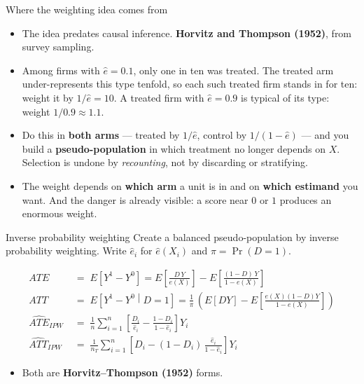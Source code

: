 \documentclass[
  11pt,
  ignorenonframetext,
  aspectratio=169,
]{beamer}
\providecommand{\tightlist}{%
  \setlength{\itemsep}{0pt}\setlength{\parskip}{0pt}}
\begin{document}
\begin{frame}{Where the weighting idea comes from}
\protect{}\label{where-the-weighting-idea-comes-from}
\begin{itemize}
\tightlist
\item
  The idea predates causal inference. \textbf{Horvitz and Thompson
  (1952)}, from survey sampling.
\item
  Among firms with \(\hat e = 0.1\), only one in ten was treated. The
  treated arm under-represents this type tenfold, so each such treated
  firm stands in for ten: weight it by \(1/\hat e = 10\). A treated firm
  with \(\hat e = 0.9\) is typical of its type: weight
  \(1/0.9 \approx 1.1\).
\item
  Do this in \textbf{both arms} --- treated by \(1/\hat e\), control by
  \(1/(1-\hat e)\) --- and you build a \textbf{pseudo-population} in
  which treatment no longer depends on \(X\). Selection is undone by
  \emph{recounting}, not by discarding or stratifying.
\item
  The weight depends on \textbf{which arm} a unit is in and on
  \textbf{which estimand} you want. And the danger is already visible: a
  score near \(0\) or \(1\) produces an enormous weight.
\end{itemize}
\end{frame}

\begin{frame}{Inverse probability weighting}
\protect{}\label{inverse-probability-weighting}
Create a balanced pseudo-population by inverse probability weighting.
Write \(\hat e_i\) for \(\hat e(X_i)\) and \(\pi = \Pr(D{=}1)\).

\small

\[
\begin{aligned}
ATE \;&=\; E\!\left[Y^1 - Y^0\right] = E\!\left[\frac{D\,Y}{e(X)}\right] - E\!\left[\frac{(1-D)\,Y}{1 - e(X)}\right] \\
ATT \;&=\; E\!\left[Y^1 - Y^0 \middle| D = 1 \right] =\frac{1}{\pi}\,\left(E\!\left[DY\right] - E\!\left[\frac{e(X)(1-D)Y}{1 - e(X)}\right]\right) \\[1em]
\widehat{ATE}_{IPW} \;&=\; \frac{1}{n}\sum_{i=1}^{n}\left[\frac{D_i}{\hat e_i} - \frac{1 - D_i}{1 - \hat e_i}\right] Y_i \\
\widehat{ATT}_{IPW} \;&=\; \frac{1}{n_T}\sum_{i=1}^{n}\left[D_i - (1 - D_i)\,\frac{\hat e_i}{1 - \hat e_i}\right] Y_i
\end{aligned}
\] \normalsize

\begin{itemize}
\tightlist
\item
  Both are \textbf{Horvitz--Thompson (1952)} forms.
\end{itemize}
\end{frame}
\end{document}
